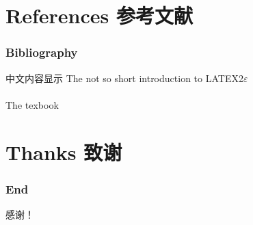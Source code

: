 \documentclass[10pt, mathserif]{beamer}	%
\newcommand{\ftitle}[1]{\frametitle{#1}}	%
\begin{document}
\section{References 参考文献}
\begin{frame}[allowframebreaks]
	\ftitle{Bibliography}
	中文内容显示
	The not so short introduction to LATEX2$\varepsilon$ \cite{Oetiker2015Latex} \\
	~\\
	The texbook \cite{knuth1984texbook}
    \label{Reference}
\end{frame}

\section{Thanks 致谢}
\begin{frame}
	\ftitle{End}
	感谢！
\end{frame}
\end{document}
